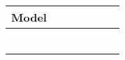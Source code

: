 \newcommand{\rlmtablerow}[7]{#1 & #7 & #2 & #3 & #4 & #5 & #6 \\}
\begin{tabular}{lllllll}
  \rlmtablerow{Model}{\coldiag{\bikesh{}}}{\coldiag{\bikesavgfull{}}}{\coldiag{\bikesavgshort{}}}{\coldiag{\bikeshdiffavgfull{}}}{\coldiag{\bikeshdiffavgshort{}}}{\coldiag{\texttt{temperature}}}
  \midrule
  \rlmtablerow{\rlmfull{}}{\checkmark}{\checkmark}{}{\checkmark}{}{}
  \rlmtablerow{\rlmfulltemp{}}{\checkmark}{\checkmark}{}{\checkmark}{}{\checkmark}
  \rlmtablerow{\rlmshort{}}{\checkmark}{}{\checkmark}{}{\checkmark}{}
  \rlmtablerow{\rlmshortfull{}}{\checkmark}{\checkmark}{\checkmark}{\checkmark}{\checkmark}{}
  \rlmtablerow{\rlmshortfulltemp{}}{\checkmark}{\checkmark}{\checkmark}{\checkmark}{\checkmark}{\checkmark}
  \rlmtablerow{\rlmshorttemp{}}{\checkmark}{}{\checkmark}{}{\checkmark}{\checkmark}
  \bottomrule
\end{tabular}
